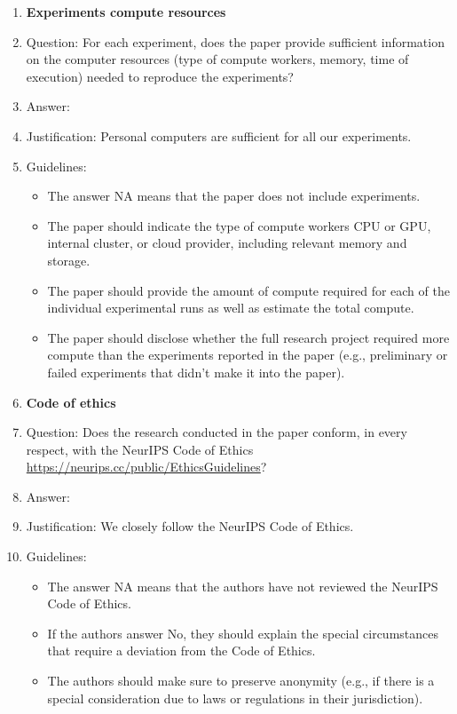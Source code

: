 \documentclass{article}
\theoremstyle{plain}
\begin{document}
\begin{enumerate}
\item {\bf Experiments compute resources}
    \item[] Question: For each experiment, does the paper provide sufficient information on the computer resources (type of compute workers, memory, time of execution) needed to reproduce the experiments?
    \item[] Answer: \answerYes{}
    \item[] Justification: Personal computers are sufficient for all our experiments.
    \item[] Guidelines:
    \begin{itemize}
        \item The answer NA means that the paper does not include experiments.
        \item The paper should indicate the type of compute workers CPU or GPU, internal cluster, or cloud provider, including relevant memory and storage.
        \item The paper should provide the amount of compute required for each of the individual experimental runs as well as estimate the total compute. 
        \item The paper should disclose whether the full research project required more compute than the experiments reported in the paper (e.g., preliminary or failed experiments that didn't make it into the paper). 
    \end{itemize}
    
\item {\bf Code of ethics}
    \item[] Question: Does the research conducted in the paper conform, in every respect, with the NeurIPS Code of Ethics \url{https://neurips.cc/public/EthicsGuidelines}?
    \item[] Answer: \answerYes{}
    \item[] Justification: We closely follow the NeurIPS Code of Ethics.
    \item[] Guidelines:
    \begin{itemize}
        \item The answer NA means that the authors have not reviewed the NeurIPS Code of Ethics.
        \item If the authors answer No, they should explain the special circumstances that require a deviation from the Code of Ethics.
        \item The authors should make sure to preserve anonymity (e.g., if there is a special consideration due to laws or regulations in their jurisdiction).
    \end{itemize}



\end{enumerate}
\end{document}
